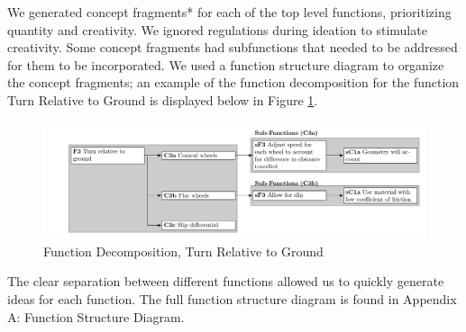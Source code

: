 \documentclass[class=../report, crop=false]{standalone}
\begin{document}
\clearpage

We generated concept fragments* for each of the top level functions, prioritizing quantity and creativity.
We ignored regulations during ideation to stimulate creativity.
Some concept fragments had subfunctions that needed to be addressed for them to be incorporated.
We used a function structure diagram to organize the concept fragments; an example of the function decomposition for the function Turn Relative to Ground is displayed below in Figure \ref{fig:turn-relative-to-ground}.


\begin{figure}[h!]
	\centering
	\includegraphics[width=\textwidth]{../../bin/turn_relative_to_ground.pdf}
	\caption{Function Decomposition, Turn Relative to Ground}
	\label{fig:turn-relative-to-ground}
\end{figure}

The clear separation between different functions allowed us to quickly generate ideas for each function.
The full function structure diagram is found in Appendix A: Function Structure Diagram.
\end{document}
